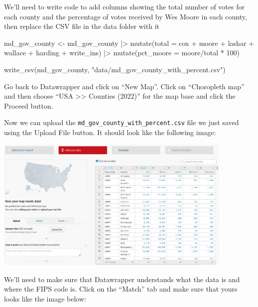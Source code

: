 \documentclass[
  letterpaper,
  DIV=11,
  numbers=noendperiod]{scrreprt}
\newenvironment{Shaded}{\begin{snugshade}}{\end{snugshade}}
\newcommand{\AttributeTok}[1]{\textcolor[rgb]{0.40,0.45,0.13}{#1}}
\newcommand{\DecValTok}[1]{\textcolor[rgb]{0.68,0.00,0.00}{#1}}
\newcommand{\FunctionTok}[1]{\textcolor[rgb]{0.28,0.35,0.67}{#1}}
\newcommand{\NormalTok}[1]{\textcolor[rgb]{0.00,0.23,0.31}{#1}}
\newcommand{\OtherTok}[1]{\textcolor[rgb]{0.00,0.23,0.31}{#1}}
\newcommand{\SpecialCharTok}[1]{\textcolor[rgb]{0.37,0.37,0.37}{#1}}
\newcommand{\StringTok}[1]{\textcolor[rgb]{0.13,0.47,0.30}{#1}}
\begin{document}
We'll need to write code to add columns showing the total number of
votes for each county and the percentage of votes received by Wes Moore
in each county, then replace the CSV file in the data folder with it

\begin{Shaded}
\begin{Highlighting}[]
\NormalTok{md\_gov\_county }\OtherTok{\textless{}{-}}\NormalTok{ md\_gov\_county }\SpecialCharTok{|\textgreater{}} 
  \FunctionTok{mutate}\NormalTok{(}\AttributeTok{total =}\NormalTok{ cox }\SpecialCharTok{+}\NormalTok{ moore }\SpecialCharTok{+}\NormalTok{ lashar }\SpecialCharTok{+}\NormalTok{ wallace }\SpecialCharTok{+}\NormalTok{ harding }\SpecialCharTok{+}\NormalTok{ write\_ins) }\SpecialCharTok{|\textgreater{}} 
  \FunctionTok{mutate}\NormalTok{(}\AttributeTok{pct\_moore =}\NormalTok{ moore}\SpecialCharTok{/}\NormalTok{total }\SpecialCharTok{*} \DecValTok{100}\NormalTok{)}

\FunctionTok{write\_csv}\NormalTok{(md\_gov\_county, }\StringTok{"data/md\_gov\_county\_with\_percent.csv"}\NormalTok{)}
\end{Highlighting}
\end{Shaded}

Go back to Datawrapper and click on ``New Map''. Click on ``Choropleth
map'' and then choose ``USA \textgreater\textgreater{} Counties (2022)''
for the map base and click the Proceed button.

Now we can upload the \texttt{md\_gov\_county\_with\_percent.csv} file
we just saved using the Upload File button. It should look like the
following image:

\includegraphics[width=4.5in,height=\textheight]{./images/datawrapper7.png}

We'll need to make sure that Datawrapper understands what the data is
and where the FIPS code is. Click on the ``Match'' tab and make sure
that yours looks like the image below:
\end{document}
